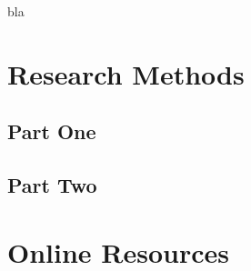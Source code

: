 \documentclass[acmtog]{acmart}
\begin{document}
	

	





\begin{acks}
	bla
\end{acks}





\appendix

\section{Research Methods}

\subsection{Part One}



\subsection{Part Two}



\section{Online Resources}
\end{document}
